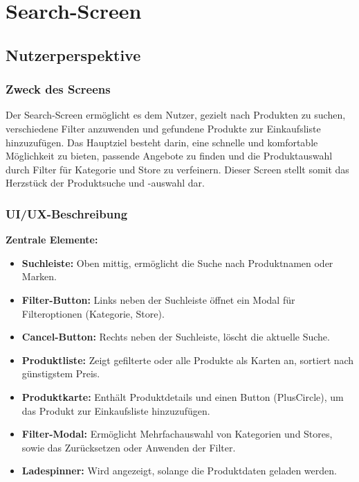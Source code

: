 \section{Search-Screen}
\label{sec:search_screen}

\subsection{Nutzerperspektive}

\subsubsection{Zweck des Screens}
Der Search-Screen ermöglicht es dem Nutzer, gezielt nach Produkten zu suchen, verschiedene Filter anzuwenden und gefundene Produkte zur Einkaufsliste hinzuzufügen. Das Hauptziel besteht darin, eine schnelle und komfortable Möglichkeit zu bieten, passende Angebote zu finden und die Produktauswahl durch Filter für Kategorie und Store zu verfeinern. Dieser Screen stellt somit das Herzstück der Produktsuche und -auswahl dar.

\subsubsection{UI/UX-Beschreibung}

\textbf{Zentrale Elemente:}
\begin{itemize}
    \item \textbf{Suchleiste:} Oben mittig, ermöglicht die Suche nach Produktnamen oder Marken.
    \item \textbf{Filter-Button:} Links neben der Suchleiste öffnet ein Modal für Filteroptionen (Kategorie, Store).
    \item \textbf{Cancel-Button:} Rechts neben der Suchleiste, löscht die aktuelle Suche.
    \item \textbf{Produktliste:} Zeigt gefilterte oder alle Produkte als Karten an, sortiert nach günstigstem Preis.
    \item \textbf{Produktkarte:} Enthält Produktdetails und einen Button (PlusCircle), um das Produkt zur Einkaufsliste hinzuzufügen.
    \item \textbf{Filter-Modal:} Ermöglicht Mehrfachauswahl von Kategorien und Stores, sowie das Zurücksetzen oder Anwenden der Filter.
    \item \textbf{Ladespinner:} Wird angezeigt, solange die Produktdaten geladen werden.
\end{itemize}

